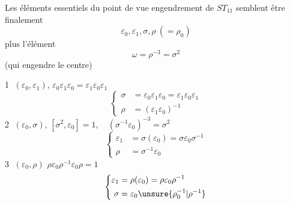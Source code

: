 Les éléments essentiels du point de vue engendrement de $ST_{11}$  semblent être finalement
\[
\varepsilon_0,\varepsilon_1,\sigma,\rho\ (=\rho_0)
\]
plus l'élément
\[\omega=\rho^{-3}=\sigma^2\]
(qui engendre le centre)

\textcircled{1} $(\varepsilon_0,\varepsilon_1)$,\quad
$\boxed{\boxed{\varepsilon_0\varepsilon_1\varepsilon_0=\varepsilon_1\varepsilon_0\varepsilon_1}}$
\[
\left\{\begin{aligned}
\sigma&=\varepsilon_0\varepsilon_1\varepsilon_0=\varepsilon_1\varepsilon_0\varepsilon_1\\
\rho&=(\varepsilon_1\varepsilon_0)^{-1}
\end{aligned}\right.
\]
\textcircled{2} $(\varepsilon_0,\sigma)$,\quad
$\boxed{[\sigma^2,\varepsilon_0]=1,\quad(\sigma^{-1}\varepsilon_0)^{-3}=\sigma^2}$
\[
\left\{\begin{aligned}
\varepsilon_1&=\sigma(\varepsilon_0)=\sigma\varepsilon_0\sigma^{-1}\\
\rho&=\sigma^{-1}\varepsilon_0
\end{aligned}\right.
\]
\margin{[\uline{sym}\quad$\begin{gathered}\varepsilon_0=\sigma(\varepsilon_1)=\sigma\varepsilon_1\sigma^{-1}\\\rho=\varepsilon_1\sigma^{-1}\end{gathered}$]}
\textcircled{3} $(\varepsilon_0,\rho)$\quad
$\boxed{\boxed{\rho\varepsilon_0\rho^{-1}\varepsilon_0\rho=1}}$
\[
\left\{\begin{aligned}
\varepsilon_1&=\rho(\varepsilon_0)=\rho\varepsilon_0\rho^{-1}\\
\sigma&=\varepsilon_0\unsure{\rho_0^{-1}|\rho^{-1}}
\end{aligned}\right.
\]
\margin{[sym\quad$\begin{gathered}\varepsilon_0=\rho^{-1}(\varepsilon_1)=\rho^{-1}\varepsilon_1\rho\\\sigma=\rho^{-1}\varepsilon_1\end{gathered}$]}
